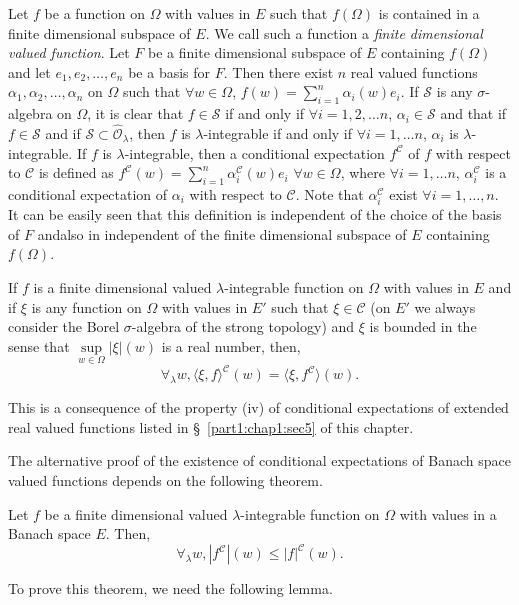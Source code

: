 Let $f$ be a function on $\Omega$ with values in $E$ such that $f
(\Omega)$ is contained in a finite dimensional subspace of $E$. We
call such a function a \textit{finite dimensional valued
  function}. Let $F$ be a finite dimensional subspace of $E$
containing $f(\Omega)$ and let $e_1, e_2, \ldots, e_n$ be a basis for
$F$. Then there exist $n$ real valued functions $\alpha_1, \alpha_2,
\ldots, \alpha_n$ on $\Omega$ such that $\forall w \in \Omega$, $f(w)
= \sum\limits^n_{i=1} \alpha_i (w) e_i$. If $\mathcal{S}$ is any
$\sigma$-algebra on $\Omega$, it is clear that $f \in \mathcal{S}$ if
and only if $\forall i = 1,2, \ldots n$, $\alpha_i \in \mathcal{S}$
and that if $f \in \mathcal{S}$ and if $\mathcal{S} \subset
\hat{\mathscr{O}}_\lambda$, then $f$ is $\lambda$-integrable if and
only if $\forall i = 1, \ldots n$, $\alpha_i$ is
$\lambda$-integrable. If $f$ is $\lambda$-integrable, then a
conditional expectation $f^\mathscr{C}$ of $f$ with respect to
$\mathscr{C}$ is defined as $f^\mathscr{C}(w) = \sum\limits^n_{i=1}
\alpha^\mathscr{C}_i (w) e_i$ $\forall w \in \Omega$, where $\forall i
= 1, \ldots n$, $\alpha^\mathscr{C}_i$ is a conditional expectation of
$\alpha_i$ with respect to $\mathscr{C}$. Note that
$\alpha^\mathscr{C}_i$ exist $\forall i = 1, \ldots, n$. It can be
easily seen that this definition is independent of the choice of the
basis of $F$ and\pageoriginale also in independent of the finite
dimensional subspace of $E$ containing $f(\Omega)$. 

\begin{rem}\label{part1:chap1:rem5}
If $f$ is a finite dimensional valued $\lambda$-integrable function
on $\Omega$ with values in $E$ and if $\xi$ is any function on
$\Omega$ with values in $E'$ such that $\xi \in \mathscr{C}$ (on $E'$
we always consider the Borel $\sigma$-algebra of the strong topology)
and $\xi$ is bounded in the sense that $\sup\limits_{w\in\Omega} |\xi|
(w)$ is a real number, then, 
$$
\forall_\lambda w, \langle \xi, f\rangle^\mathscr{C} (w) = \langle
\xi, f^\mathscr{C} \rangle  (w). 
$$

This is a consequence of the property (iv) of conditional expectations
of extended real valued functions listed in \S\ \ref{part1:chap1:sec5}
of this chapter.  
\end{rem}

The alternative proof of the existence of conditional expectations of
Banach space valued functions depends on the following theorem. 

\begin{thm}\label{part1:chap1:thm6}
Let $f$ be a finite dimensional valued $\lambda$-integrable function
on $\Omega$ with values in a Banach space $E$. Then,
$$
\forall_\lambda w, |f^\mathscr{C}| (w) \leq |f|^\mathscr{C} (w). 
$$

To prove this theorem, we need the following lemma. 
\end{thm}

